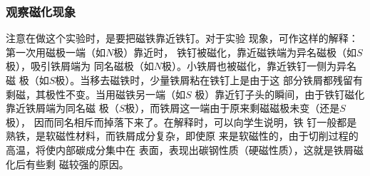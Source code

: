 \subsubsection{观察磁化现象}
注意在做这个实验时，是要把磁铁靠近铁钉。对于实验
现象，可作这样的解释：第一次用磁极一端（如$N$极）靠近时，
铁钉被磁化，靠近磁铁端为异名磁极（如$S$极），吸引铁屑端为
同名磁极（如$N$极）。小铁屑也被磁化，靠近铁钉一侧为异名磁
极（如$S$极）。当移去磁铁时，少量铁屑粘在铁钉上是由于这
部分铁屑都残留有剩磁，其极性不变。当用磁铁另一端（如$S$
极）靠近钉子头的瞬间，由于铁钉磁化靠近铁屑端为同名磁
极（$S$极），而铁屑这一端由于原来剩磁磁极未变（还是$S$极），
因而同名相斥而掉落下来了。在解释时，可以向学生说明，铁
钉一般都是熟铁，是软磁性材料，而铁屑成分复杂，即使原
来是软磁性的，由于切削过程的高温，将使内部碳成分集中在
表面，表现出碳钢性质（硬磁性质），这就是铁屑磁化后有些剩
磁较强的原因。


